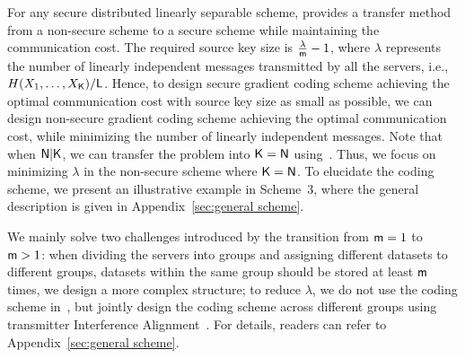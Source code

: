 \documentclass[conference,letterpaper]{IEEEtran}
\begin{document}


For any secure distributed linearly separable scheme, \cite[Theorem 1]{wan2022secure} provides a transfer method from a non-secure scheme to a secure scheme while maintaining the communication cost.
The required source key size is $\frac{\lambda}{{\sf m}} - 1$, where $\lambda$ represents the number of linearly independent messages transmitted by all the servers, i.e., $H(X_1,\ldots,X_{{\sf K}})/{\sf L}$. Hence, to design secure gradient coding scheme achieving the optimal communication cost with  source key size as small as possible, we can design 
non-secure gradient coding scheme achieving the optimal communication cost, while minimizing the  number of linearly independent messages.
Note that when ${\sf N} | {\sf K} $, we can transfer the problem into ${\sf K} = {\sf N}$ using~\cite[Remark 1]{wan2022secure}.  Thus, we focus on minimizing $\lambda$ in the non-secure scheme where ${\sf K}= {\sf N}$. To elucidate the coding scheme, we present an illustrative example in Scheme~3, where the general description is given in Appendix~\ref{sec:general scheme}.

We mainly solve two challenges introduced by the transition from ${\sf m}=1$ to ${\sf m} > 1$: when dividing the servers into groups and assigning different datasets to different groups, datasets within the same group should be stored at least ${\sf m}$ times, we design a more complex structure; to reduce $\lambda$, we do not use the coding scheme in~\cite{Heterogeneous_Gradient_Coding}, but jointly design the coding scheme across different groups using transmitter Interference Alignment~\cite{2008Interference_Alignment, MIMO_interference_channel, huang2023ISITversion}.   
For details,  readers can refer to Appendix~\ref{sec:general scheme}.





\end{document}
